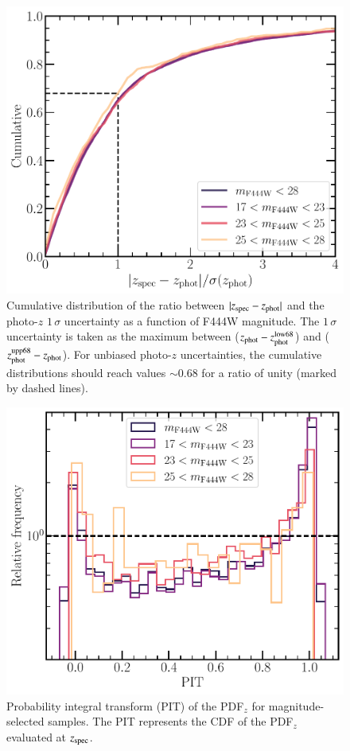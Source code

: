 \documentclass[longauth]{aa}
\begin{document}
\begin{figure}[t!]
\includegraphics[width=0.88\columnwidth]{figures/zphot_err_cumulative.pdf}
\caption{Cumulative distribution of the ratio between $|z_{\rm spec} - z_{\rm phot}|$ and the photo-$z$ $1\,\sigma$ uncertainty as a function of F444W magnitude. The $1\,\sigma$ uncertainty is taken as the maximum between ($z_{\rm phot} - z_{\rm phot}^{\rm low 68}$) and ($z_{\rm phot}^{\rm upp 68} - z_{\rm phot}$). For unbiased photo-$z$ uncertainties, the cumulative distributions should reach values $\sim 0.68$ for a ratio of unity (marked by dashed lines).
}
\label{fig:zphot-err-cumulative}
\end{figure}



\begin{figure}[t!]
\includegraphics[width=0.88\columnwidth]{figures/PIT-statistic.pdf}
\caption{Probability integral transform (PIT) of the PDF$_z$ for magnitude-selected samples. The PIT represents the CDF of the PDF$_z$ evaluated at $z_{\rm spec}$.
}
\label{fig:PIT-statistic}
\end{figure}
\end{document}
